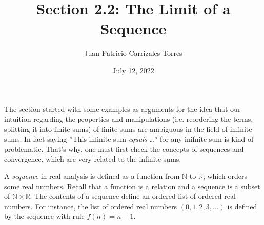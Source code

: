 \documentclass[12pt]{article}
\newcommand{\N}{\mathbb{N}}
\newcommand{\R}{\mathbb{R}}
\begin{document}
  
\title{Section 2.2: The Limit of a Sequence}
   \author{Juan Patricio Carrizales Torres}
     \date{July 12, 2022}
       \maketitle
     
       The section started with some examples as arguments for the idea that our intuition regarding the properties and manipulations (i.e. reordering the terms, splitting it into finite sums) of finite sums are ambiguous in the field of infinite sums. In fact saying ''This infinite sum \textit{equals} \dots'' for any inifnite sum is kind of problematic. That's why, one must first check the concepts of sequences and convergence, which are very related to the infinite sums. 

       A \textit{sequence} in real analysis is defined as a function from $\N$ to $\R$, which orders some real numbers. Recall that a function is a relation and a sequence is a subset of $\N \times \R$. The contents of a  sequence define an ordered list of ordered real numbers. For instance, the list of ordered real numbers $(0,1,2,3,\dots)$ is defined by the sequence with rule $f(n) = n-1$. \\
\end{document}

